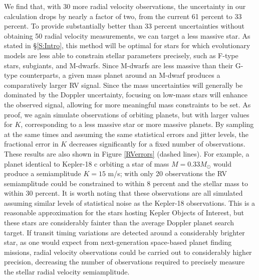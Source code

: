 We find that, with 30 more radial velocity observations, the uncertainty in our calculation drops by nearly a factor of two, from the current 61 percent to 33 percent. To provide substantially better than 33 percent uncertainties without obtaining 50 radial velocity measurements, we can target a less massive star. As stated in \S \ref{S:Intro}, this method will be optimal for stars for which evolutionary models are less able to constrain stellar parameters precisely, such as F-type stars, subgiants, and M-dwarfs. Since M-dwarfs are less massive than their G-type counterparts, a given mass planet around an M-dwarf produces a comparatively larger RV signal. Since the mass uncertainties will generally be dominated by the Doppler uncertainty, focusing on low-mass stars will enhance the observed signal, allowing for more meaningful mass constraints to be set. As proof, we again simulate observations of orbiting planets, but with larger values for $K$, corresponding to a less massive star or more massive planets. By sampling at the same times and assuming the same statistical errors and jitter levels, the fractional error in $K$ decreases significantly for a fixed number of observations. These results are also shown in Figure \ref{RVerrors} (dashed lines). For example, a planet identical to Kepler-18 c orbiting a star of mass $M = 0.33 M_\odot$ would produce a semiamplitude $K = 15$ m/s; with only 20 observations the RV semiamplitude could be constrained to within 8 percent and the stellar mass to within 30 percent. It is worth noting that these observations are all simulated assuming similar levels of statistical noise as the Kepler-18 observations. This is a reasonable approximation for the stars hosting Kepler Objects of Interest, but these stars are considerably fainter than the average Doppler planet search target. If transit timing variations are detected around a considerably brighter star, as one would expect from next-generation space-based planet finding missions, radial velocity observations could be carried out to considerably higher precision, decreasing the number of observations required to precisely measure the stellar radial velocity semiamplitude.

